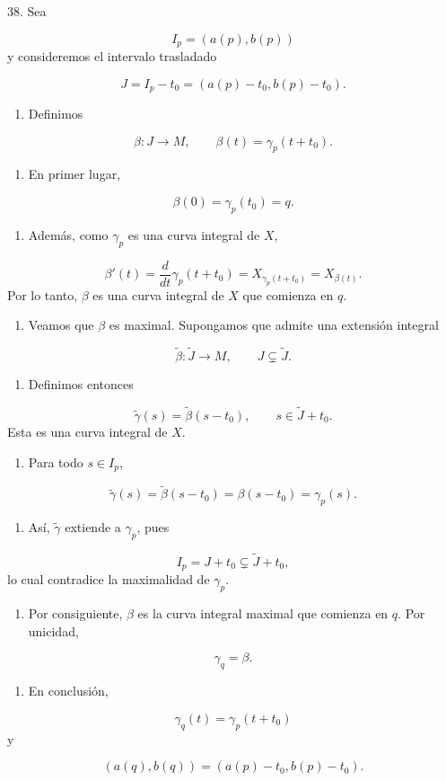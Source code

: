 \begin{bookproof}{}
38. Sea

\[
I_p=(a(p),b(p))
\]
y consideremos el intervalo trasladado

\[
J=I_p-t_0=(a(p)-t_0,b(p)-t_0).
\]
\begin{enumerate}[start=39]
\item Definimos
\end{enumerate}
\[
\beta:J\longrightarrow M,\qquad \beta(t)=\gamma_p(t+t_0).
\]
\begin{enumerate}[start=40]
\item En primer lugar,
\end{enumerate}
\[
\beta(0)=\gamma_p(t_0)=q.
\]
\begin{enumerate}[start=41]
\item Además, como $\gamma_p$ es una curva integral de $X$,
\end{enumerate}
\[
\beta'(t)=\frac{d}{dt}\gamma_p(t+t_0)=X_{\gamma_p(t+t_0)}=X_{\beta(t)}.
\]
Por lo tanto, $\beta$ es una curva integral de $X$ que comienza en $q$.

\begin{enumerate}[start=42]
\item Veamos que $\beta$ es maximal. Supongamos que admite una extensión integral
\end{enumerate}
\[
\widetilde{\beta}:\widetilde{J}\longrightarrow M,\qquad J\subsetneq\widetilde{J}.
\]
\begin{enumerate}[start=43]
\item Definimos entonces
\end{enumerate}
\[
\widetilde{\gamma}(s)=\widetilde{\beta}(s-t_0),\qquad s\in\widetilde{J}+t_0.
\]
Esta es una curva integral de $X$.

\begin{enumerate}[start=44]
\item Para todo $s\in I_p$,
\end{enumerate}
\[
\widetilde{\gamma}(s)=\widetilde{\beta}(s-t_0)=\beta(s-t_0)=\gamma_p(s).
\]
\begin{enumerate}[start=45]
\item Así, $\widetilde{\gamma}$ extiende a $\gamma_p$, pues
\end{enumerate}
\[
I_p=J+t_0\subsetneq\widetilde{J}+t_0,
\]
lo cual contradice la maximalidad de $\gamma_p$.

\begin{enumerate}[start=46]
\item Por consiguiente, $\beta$ es la curva integral maximal que comienza en $q$. Por unicidad,
\end{enumerate}
\[
\gamma_q=\beta.
\]
\begin{enumerate}[start=47]
\item En conclusión,
\end{enumerate}
\[
\gamma_q(t)=\gamma_p(t+t_0)
\]
y

\[
(a(q),b(q))=(a(p)-t_0,b(p)-t_0).
\]
\bookqed
\end{bookproof}
